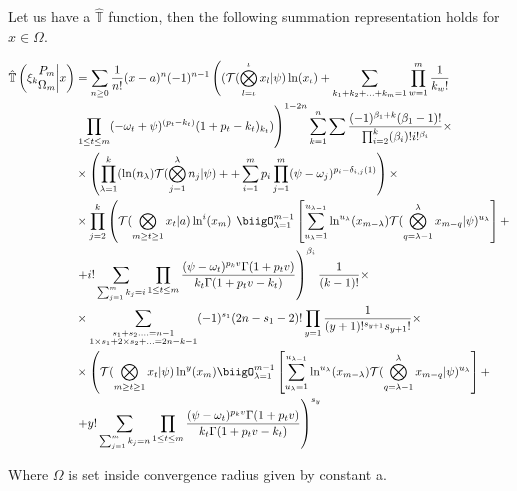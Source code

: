 \begin{theorem}
        Let us have a \(\hat{\mathbb{T}}\) function, then the following summation representation holds for \(x \in \Omega\).
        
        \begin{align}
                \hat{\mathbb{T}}\left( \xi_k \begin{matrix} P_m \\ \Omega_m \end{matrix}
                \bigg| x  \right) &= \sum_{n\geq 0}\frac{1}{n!}(x-a)^n(-1)^{n-1}\left( 
                (\mathcal{T}(\bigotimes_{l=\iota}^\iota x_l |\psi)\ln(x_\iota) + \sum_{k_1 
                + k_2 + ... + k_m = 1}\prod_{w=1}^m\frac{1}{k_w!} \right. \\ &\left.\prod_{1 
                \leq t \leq m}(-\omega_t + \psi)^{(p_t - k_t)}(1+p_t-k_t)_{k_t})\right)^{1-2n}
                \sum_{k=1}^n \sum \frac{(-1)^{\beta_1 + k}(\beta_1 -1)!}{\prod_{i=2}^k (\beta_i)!
                i!^{\beta_i}} \times\\ & \times \left(\prod_{\lambda = 1}^k (\ln(n_\lambda) 
                \mathcal{T}(\bigotimes_{j=1}^\lambda n_j |\psi) + 
                +\sum_{i=1}^m p_i \prod_{j=1}^m (\psi-\omega_j)^{p_i-\delta_{i, j}(1)} \right) 
                \times \\ & \times \prod_{j=2}^k
                \left(\mathcal{T}(\bigotimes_{m \geq t \geq 1}x_t| a) \ln^i (x_m) \right.
                \left. \biigO_{\lambda = 1}^{m-1} \left[\sum_{u_{\lambda}=1}^{u_{\lambda-1}}
                \ln^{u_{\lambda}}(x_{m-\lambda}) \mathcal{T}(\bigotimes_{q = \lambda-1}^\lambda
                x_{m-q} |\psi)^{u_{\lambda}} \right] + \right.\\
                &\left.+ i! \sum_{\sum_{j=1}^m k_j = i}\prod_{1 \leq t \leq m} \frac{(\psi - 
                \omega_t)^{p_k v}\Gamma(1+p_t v)}{k_t\Gamma(1+p_t v - k_t)}\right)^{\beta_i}
                \frac{1}{(k-1)!} \times \\ & \times \sum_{\substack{s_1 + s_2 . ... = n-1 \\
                1\times s_1 + 2 \times s_2 + ... = 2n-k-1}}(-1)^{s_1}(2n-s_1 -2)! \prod_{y = 1}
                \frac{1}{(y+1)!^{s_{y+1}}s_{y+1}!} \times \\ & \times 
                \left( \mathcal{T}(\bigotimes_{m \geq t \geq 1}x_t| \psi) \ln^y (x_m) \biigO_{\lambda 
                = 1}^{m-1} \left[\sum_{u_{\lambda}=1}^{u_{\lambda-1}}\ln^{u_{\lambda}}(x_{m-\lambda}) 
                \mathcal{T}(\bigotimes_{q = \lambda-1}^\lambda x_{m-q} |\psi)^{u_{\lambda}} \right] +
                \right. \\ & \left. + y! \sum_{\sum_{j=1}^m k_j = n}\prod_{1 \leq t \leq m} \frac{(\psi 
                - \omega_t)^{p_k v}\Gamma(1+p_t v)}{k_t\Gamma(1+p_t v - k_t)}
                \right)^{s_y}
        \end{align}
        
        Where \(\Omega\) is set inside convergence radius given by constant a.
        
\end{theorem}
